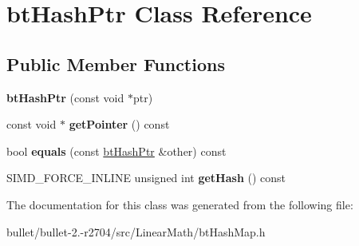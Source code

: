 \hypertarget{classbt_hash_ptr}{\section{bt\+Hash\+Ptr Class Reference}
\label{classbt_hash_ptr}
}
\subsection*{Public Member Functions}
\begin{DoxyCompactItemize}
\item 
\hypertarget{classbt_hash_ptr_a15f7d80f635d14c1885bfe90e3154642}{{\bfseries bt\+Hash\+Ptr} (const void $\ast$ptr)}\label{classbt_hash_ptr_a15f7d80f635d14c1885bfe90e3154642}

\item 
\hypertarget{classbt_hash_ptr_ab980113eb81d9431d157af8d726c32a2}{const void $\ast$ {\bfseries get\+Pointer} () const }\label{classbt_hash_ptr_ab980113eb81d9431d157af8d726c32a2}

\item 
\hypertarget{classbt_hash_ptr_ad4d263646fb8056b7dce38692ffd4b65}{bool {\bfseries equals} (const \hyperlink{classbt_hash_ptr}{bt\+Hash\+Ptr} \&other) const }\label{classbt_hash_ptr_ad4d263646fb8056b7dce38692ffd4b65}

\item 
\hypertarget{classbt_hash_ptr_a1cb3de4f996a81f6f5adceb080677cef}{S\+I\+M\+D\+\_\+\+F\+O\+R\+C\+E\+\_\+\+I\+N\+L\+I\+N\+E unsigned int {\bfseries get\+Hash} () const }\label{classbt_hash_ptr_a1cb3de4f996a81f6f5adceb080677cef}

\end{DoxyCompactItemize}


The documentation for this class was generated from the following file\+:\begin{DoxyCompactItemize}
\item 
bullet/bullet-\/2.-\/r2704/src/\+Linear\+Math/bt\+Hash\+Map.\+h\end{DoxyCompactItemize}
